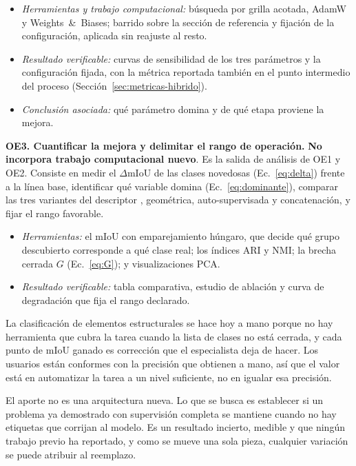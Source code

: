 \begin{itemize}\setlength{\itemsep}{0pt}
\item \textit{Herramientas y trabajo computacional:} búsqueda por grilla acotada,
AdamW y Weights~\&~Biases; barrido sobre la sección de referencia y fijación de
la configuración, aplicada sin reajuste al resto.
\item \textit{Resultado verificable:} curvas de sensibilidad de los tres
parámetros y la configuración fijada, con la métrica reportada también en el
punto intermedio del proceso (Sección~\ref{sec:metricas-hibrido}).
\item \textit{Conclusión asociada:} qué parámetro domina y de qué etapa proviene
la mejora.
\end{itemize}

\medskip
\noindent\textbf{OE3. Cuantificar la mejora y delimitar el rango de operación.}
\textbf{No incorpora trabajo computacional nuevo}. Es la salida de análisis de OE1
y OE2. Consiste en medir el $\Delta$mIoU de las clases novedosas
(Ec.~\eqref{eq:delta}) frente a la línea base, identificar qué variable domina
(Ec.~\eqref{eq:dominante}), comparar las tres variantes del descriptor
, geométrica, auto-supervisada y concatenación,  y fijar el rango favorable.

\begin{itemize}\setlength{\itemsep}{0pt}
\item \textit{Herramientas:} el mIoU con emparejamiento húngaro, que decide qué
grupo descubierto corresponde a qué clase real; los índices ARI y NMI; la brecha
cerrada $G$ (Ec.~\eqref{eq:G}); y visualizaciones PCA.
\item \textit{Resultado verificable:} tabla comparativa, estudio de ablación y
curva de degradación que fija el rango declarado.
\end{itemize}


La clasificación de elementos estructurales se hace hoy a mano porque no hay
herramienta que cubra la tarea cuando la lista de clases no está cerrada, y cada
punto de mIoU ganado es corrección que el especialista deja de hacer. Los
usuarios están conformes con la precisión que obtienen a mano, así que el valor
está en automatizar la tarea a un nivel suficiente, no en igualar esa precisión.

El aporte no es una arquitectura nueva. Lo que se busca es establecer si un problema ya
demostrado con supervisión completa se mantiene cuando no hay etiquetas que
corrijan al modelo. Es un resultado incierto, medible y que ningún trabajo previo
ha reportado, y como se mueve una sola pieza, cualquier variación se puede
atribuir al reemplazo.

